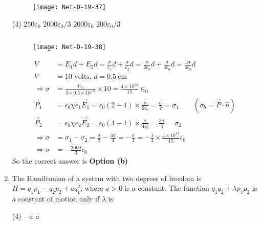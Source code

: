 \begin{enumerate}
\begin{figure}[H]
	\centering
	\texttt{[image: Net-D-19-37]}
\end{figure}
 \begin{tasks}(4)
	\task[\textbf{a.}]$250 \varepsilon_{0}$
	\task[\textbf{b.}]$2000 \varepsilon_{0} / 3$
	\task[\textbf{c.}] $2000 \varepsilon_{0}$
	\task[\textbf{d.}] $200 \varepsilon_{0} / 3$
\end{tasks}
\begin{answer}$\left. \right. $
	\begin{figure}[H]
		\centering
		\texttt{[image: Net-D-19-38]}
	\end{figure}
	\begin{align*}
	V&=E_{1} d+E_{2} d=\frac{\sigma}{\epsilon_{1}} d+\frac{\sigma}{\epsilon_{2}} d=\frac{\sigma}{2 \epsilon_{0}} d+\frac{\sigma}{4 \epsilon_{0}} d=\frac{3 \sigma}{4 \epsilon_{0}} d\\
	V&=10 \text { volts, } d=0.5 \mathrm{~cm} \\
	\Rightarrow \sigma&=\frac{4 \epsilon_{0}}{3 \times 0.5 \times 10^{-2}} \times 10=\frac{4 \times 10^{14}}{15} \in_{0} \\
	\vec{P}_{1}&=\epsilon_{0} \chi e_{1} \vec{E}_{1}=\epsilon_{0}(2-1) \times \frac{\sigma}{2 \epsilon_{0}}=\frac{\sigma}{2}=\sigma_{1}\qquad \left(\sigma_{b}=\vec{P} \cdot \hat{n}\right)\\
	\vec{P}_{2}&=\epsilon_{0} \chi e_{2} \vec{E}_{2}=\epsilon_{0}(4-1) \times \frac{\sigma}{4 \epsilon_{0}}=\frac{3 \sigma}{4}=\sigma_{2} \\
	\Rightarrow \sigma&=\sigma_{1}-\sigma_{2}=\frac{\sigma}{2}-\frac{3 \sigma}{4}=-\frac{\sigma}{4}=-\frac{1}{4} \times \frac{4 \times 10^{14}}{15} \epsilon_{0} \\
	\Rightarrow \sigma&=-\frac{2000}{3} \epsilon_{0}
	\end{align*}
		So the correct answer is \textbf{Option (b)}
\end{answer}
\item The Hamiltonian of a system with two degrees of freedom is $H=q_{1} p_{1}-q_{2} p_{2}+a q_{1}^{2}$, where $a>0$ is a constant. The function $q_{1} q_{2}+\lambda p_{1} p_{2}$ is a constant of motion only if $\lambda$ is
 \begin{tasks}(4)
	\task[\textbf{c.}]$-a$
	\task[\textbf{d.}] $a$
\end{tasks}
\begin{answer}
	\begin{align*}

\end{align*}
\end{answer}
\end{enumerate}

